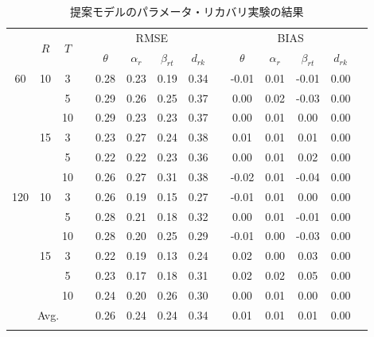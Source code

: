 \documentclass[twocolumn,10pt]{jsarticle}
\newcommand{\bhline}[1]{\noalign{\hrule height #1}}
\begin{document}
\begin{table}[t]
  \begin{minipage}[t]{8cm}
    \centering
    \caption{提案モデルのパラメータ・リカバリ実験の結果}
    \setlength{\tabcolsep}{5.pt}
    \scalebox{0.8}
    {
    \begin{tabular}{cccccccccccccc}  
      \bhline{1pt}
      \multirow{2}{*}{$J$} & \multirow{2}{*}{$R$} & \multirow{2}{*}{$T$}  && \multicolumn{4}{c}{RMSE} &&   \multicolumn{4}{c}{BIAS}  \\
      \cline{5-8}\cline{10-13}
      & & & & $\theta$ & $\alpha_r$ & $\beta_{rt}$ & $d_{rk}$ &  & $\theta$ & $\alpha_r$ & $\beta_{rt}$ & $d_{rk}$ \\
      \bhline{1pt}
      60 & 10 & 3  && 0.28 & 0.23 & 0.19 & 0.34 && -0.01 & 0.01 & -0.01 & 0.00 \\
      &    & 5  && 0.29 & 0.26 & 0.25 & 0.37 && 0.00  & 0.02 & -0.03 & 0.00 \\
      &    & 10 && 0.29 & 0.23 & 0.23 & 0.37 && 0.00  & 0.01 & 0.00  & 0.00 \\
      \cline{2-14}
      & 15 & 3  && 0.23 & 0.27 & 0.24 & 0.38 && 0.01  & 0.01 & 0.01  & 0.00 \\
      &    & 5  && 0.22 & 0.22 & 0.23 & 0.36 && 0.00  & 0.01 & 0.02  & 0.00 \\
      &    & 10 && 0.26 & 0.27 & 0.31 & 0.38 && -0.02 & 0.01 & -0.04 & 0.00 \\
      \hline
      120 & 10 & 3  && 0.26 & 0.19 & 0.15 & 0.27 && -0.01 & 0.01 & 0.00  & 0.00 \\
      &    & 5  && 0.28 & 0.21 & 0.18 & 0.32 && 0.00  & 0.01 & -0.01 & 0.00 \\
      &    & 10 && 0.28 & 0.20 & 0.25 & 0.29 && -0.01 & 0.00 & -0.03 & 0.00\\
      \cline{2-14}
      & 15 & 3  && 0.22 & 0.19 & 0.13 & 0.24 && 0.02 & 0.00 & 0.03 & 0.00 \\
      &    & 5  && 0.23 & 0.17 & 0.18 & 0.31 && 0.02 & 0.02 & 0.05 & 0.00 \\
      &    & 10 && 0.24 & 0.20 & 0.26 & 0.30 && 0.00 & 0.01 & 0.00 & 0.00 \\
      \hline
      \multicolumn{4}{c}{Avg.}   &  0.26 & 0.24 & 0.24 & 0.34 &  & 0.01 & 0.01 & 0.01 & 0.00 & \\
      \bhline{1pt}
    \end{tabular}
    }
    \label{parameters_recovery}
  \end{minipage}
\end{table}
  
\end{document}
